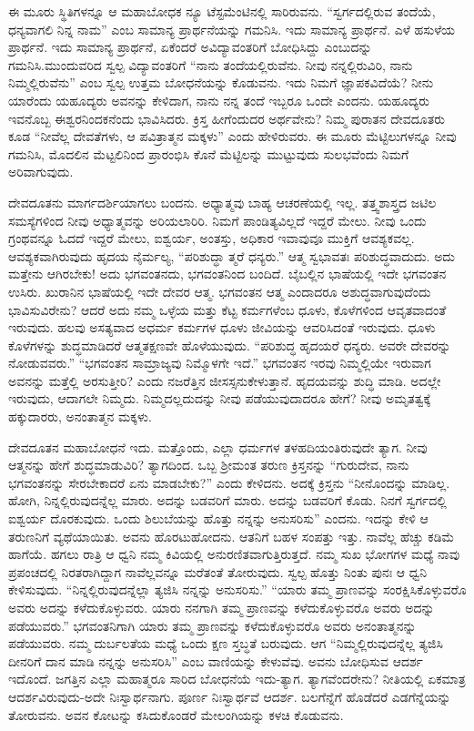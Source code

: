 ಈ ಮೂರು ಸ್ಥಿತಿಗಳನ್ನೂ ಆ ಮಹಾಬೋಧಕ ನ್ಯೂ ಟೆಸ್ಟಮೆಂಟಿನಲ್ಲಿ ಸಾರಿರುವನು. “ಸ್ವರ್ಗದಲ್ಲಿರುವ ತಂದೆಯೆ, ಧನ್ಯವಾಗಲಿ ನಿನ್ನ ನಾಮ” ಎಂಬ ಸಾಮಾನ್ಯ ಪ್ರಾರ್ಥನೆಯನ್ನು ಗಮನಿಸಿ. ಇದು ಸಾಮಾನ್ಯ ಪ್ರಾರ್ಥನೆ. ಎಳೆ ಹಸುಳೆಯ ಪ್ರಾರ್ಥನೆ. ಇದು ಸಾಮಾನ್ಯ ಪ್ರಾರ್ಥನೆ, ಏಕೆಂದರೆ ಅವಿದ್ಯಾವಂತರಿಗೆ ಬೋಧಿಸಿದ್ದು ಎಂಬುದನ್ನು ಗಮನಿಸಿ.\break ಮುಂದುವರಿದ ಸ್ವಲ್ಪ ವಿದ್ಯಾವಂತರಿಗೆ “ನಾನು ತಂದೆಯಲ್ಲಿರುವೆನು. ನೀವು ನನ್ನಲ್ಲಿರುವಿರಿ, ನಾನು ನಿಮ್ಮಲ್ಲಿರುವೆನು” ಎಂಬ ಸ್ವಲ್ಪ ಉತ್ತಮ ಬೋಧನೆಯನ್ನು ಕೊಡುವನು. ಇದು ನಿಮಗೆ ಜ್ಞಾಪಕವಿದೆಯೆ? ನೀನು ಯಾರೆಂದು ಯಹೂದ್ಯರು ಅವನನ್ನು ಕೇಳಿದಾಗ, ನಾನು ನನ್ನ ತಂದೆ ಇಬ್ಬರೂ ಒಂದೇ ಎಂದನು. ಯಹೂದ್ಯರು ಇವನೊಬ್ಬ ಈಶ್ವರನಿಂದಕನೆಂದು ಭಾವಿಸಿದರು. ಕ್ರಿಸ್ತ ಹೀಗೆಂದುದರ ಅರ್ಥವೇನು? ನಿಮ್ಮ ಪುರಾತನ ದೇವದೂತರು ಕೂಡ “ನೀವೆಲ್ಲ ದೇವತೆಗಳು, ಆ ಪವಿತ್ರಾತ್ಮನ ಮಕ್ಕಳು” ಎಂದು ಹೇಳಿರುವರು. ಈ ಮೂರು ಮೆಟ್ಟಿಲುಗಳನ್ನೂ ನೀವು ಗಮನಿಸಿ, ಮೊದಲಿನ ಮೆಟ್ಟಲಿನಿಂದ ಪ್ರಾರಂಭಿಸಿ ಕೊನೆ ಮೆಟ್ಟಿಲನ್ನು ಮುಟ್ಟುವುದು ಸುಲಭವೆಂದು ನಿಮಗೆ ಅರಿವಾಗುವುದು.

ದೇವದೂತನು ಮಾರ್ಗದರ್ಶಿಯಾಗಲು ಬಂದನು. ಅಧ್ಯಾತ್ಮವು ಬಾಹ್ಯ ಆಚರಣೆಯಲ್ಲಿ ಇಲ್ಲ. ತತ್ತ್ವಶಾಸ್ತ್ರದ ಜಟಿಲ ಸಮಸ್ಯೆಗಳಿಂದ ನೀವು ಅಧ್ಯಾತ್ಮವನ್ನು ಅರಿಯಲಾರಿರಿ. ನಿಮಗೆ ಪಾಂಡಿತ್ಯವಿಲ್ಲದೆ ಇದ್ದರೆ ಮೇಲು. ನೀವು ಒಂದು ಗ್ರಂಥವನ್ನೂ ಓದದೆ ಇದ್ದರೆ ಮೇಲು, ಐಶ್ವರ್ಯ, ಅಂತಸ್ತು, ಅಧಿಕಾರ ಇವಾವುವೂ ಮುಕ್ತಿಗೆ ಆವಶ್ಯಕವಲ್ಲ. ಆವಶ್ಯಕ\-ವಾಗಿರುವುದು ಹೃದಯ ನೈರ್ಮಲ್ಯ, “ಪರಿಶುದ್ಧಾ ತ್ಮರೆ ಧನ್ಯರು.” ಆತ್ಮ ಸ್ವಭಾವತಃ ಪರಿಶುದ್ಧ\-ವಾದುದು. ಅದು ಮತ್ತೇನು ಆಗಿರಬೇಕು! ಅದು ಭಗವಂತನದು, ಭಗವಂತನಿಂದ ಬಂದಿದೆ. ಬೈಬಲ್ಲಿನ ಭಾಷೆಯಲ್ಲಿ ಇದೇ ಭಗವಂತನ ಉಸಿರು. ಖುರಾನಿನ ಭಾಷೆಯಲ್ಲಿ ಇದೇ ದೇವರ ಆತ್ಮ. ಭಗವಂತನ ಆತ್ಮ ಎಂದಾದರೂ ಅಶುದ್ಧವಾಗುವುದೆಂದು ಭಾವಿಸುವಿ\-ರೇನು? ಆದರೆ ಅದು ನಮ್ಮ ಒಳ್ಳೆಯ ಮತ್ತು ಕೆಟ್ಟ ಕರ್ಮಗಳೆಂಬ ಧೂಳು, ಕೊಳೆಗಳಿಂದ ಆವೃತ\-ವಾದಂತೆ ಇರುವುದು. ಹಲವು ಅಸತ್ಯವಾದ ಅಧರ್ಮ ಕರ್ಮಗಳ ಧೂಳು ಜೀವಿಯನ್ನು ಆವರಿಸಿದಂತೆ ಇರುವುದು. ಧೂಳು ಕೊಳೆಗಳನ್ನು ಶುದ್ಧಮಾಡಿದರೆ ಆತ್ಮ\break ತಕ್ಷಣವೇ ಹೊಳೆಯುವುದು. “ಪರಿಶುದ್ಧ ಹೃದಯರೆ ಧನ್ಯರು. ಅವರೇ ದೇವರನ್ನು ನೋಡುವವರು.” “ಭಗವಂತನ ಸಾಮ್ರಾಜ್ಯವು ನಿಮ್ಮೊಳಗೇ ಇದೆ.” ಭಗವಂತನ ಇರವು ನಿಮ್ಮಲ್ಲಿಯೇ ಇರುವಾಗ ಅವನನ್ನು ಮತ್ತೆಲ್ಲಿ ಅರಸುತ್ತೀರಿ? ಎಂದು ನಜರೆತ್ತಿನ ಜೀಸಸ್ಸನು\break ಕೇಳುತ್ತಾನೆ. ಹೃದಯವನ್ನು ಶುದ್ಧಿ ಮಾಡಿ. ಅದಲ್ಲೇ ಇರುವುದು, ಆದಾಗಲೇ ನಿಮ್ಮದು. ನಿಮ್ಮದಲ್ಲದುದನ್ನು ನೀವು ಪಡೆಯುವುದಾದರೂ ಹೇಗೆ? ನೀವು ಅಮೃತತ್ವಕ್ಕೆ ಹಕ್ಕು\-ದಾರರು, ಅನಂತಾತ್ಮನ ಮಕ್ಕಳು.

ದೇವದೂತನ ಮಹಾಬೋಧನೆ ಇದು. ಮತ್ತೊಂದು, ಎಲ್ಲಾ ಧರ್ಮಗಳ ತಳಹದಿಯಂತಿರುವುದೇ ತ್ಯಾಗ. ನೀವು ಆತ್ಮನನ್ನು ಹೇಗೆ ಶುದ್ಧಮಾಡುವಿರಿ? ತ್ಯಾಗದಿಂದ. ಒಬ್ಬ ಶ‍್ರೀಮಂತ ತರುಣ ಕ್ರಿಸ್ತನನ್ನು “ಗುರುದೇವ, ನಾನು ಭಗವಂತನನ್ನು ಸೇರಬೇಕಾದರೆ ಏನು ಮಾಡಬೇಕು?” ಎಂದು ಕೇಳಿದನು. ಅದಕ್ಕೆ ಕ್ರಿಸ್ತನು “ನೀನೊಂದನ್ನು ಮಾಡಿಲ್ಲ. ಹೋಗಿ, ನಿನ್ನಲ್ಲಿರುವುದನ್ನೆಲ್ಲ ಮಾರು. ಅದನ್ನು ಬಡವರಿಗೆ ಮಾರು. ಅದನ್ನು ಬಡವರಿಗೆ ಕೊಡು. ನಿನಗೆ ಸ್ವರ್ಗದಲ್ಲಿ ಐಶ್ವರ್ಯ ದೊರಕುವುದು. ಒಂದು ಶಿಲುಬೆಯನ್ನು ಹೊತ್ತು ನನ್ನನ್ನು ಅನುಸರಿಸು” ಎಂದನು. ಇದನ್ನು ಕೇಳಿ ಆ ತರುಣನಿಗೆ ವ್ಯಥೆ\-ಯಾಯಿತು. ಅವನು ಹೊರಟುಹೋದನು. ಆತನಿಗೆ ಬಹಳ ಸಂಪತ್ತು ಇತ್ತು. ನಾವೆಲ್ಲ ಹೆಚ್ಚು ಕಡಿಮೆ ಹಾಗೆಯೆ. ಹಗಲು ರಾತ್ರಿ ಆ ಧ್ವನಿ ನಮ್ಮ ಕಿವಿಯಲ್ಲಿ ಅನುರಣಿತವಾಗುತ್ತಿರುತ್ತದೆ. ನಮ್ಮ ಸುಖ ಭೋಗಗಳ ಮಧ್ಯೆ ನಾವು ಪ್ರಪಂಚದಲ್ಲಿ ನಿರತರಾಗಿದ್ದಾಗ ನಾವೆಲ್ಲವನ್ನೂ ಮರೆತಂತೆ ತೋರುವುದು. ಸ್ವಲ್ಪ ಹೊತ್ತು ನಿಂತು ಪುನಃ ಆ ಧ್ವನಿ ಕೇಳಿಸುವುದು. “ನಿನ್ನಲ್ಲಿರುವುದನ್ನೆಲ್ಲಾ ತ್ಯಜಿಸಿ ನನ್ನನ್ನು ಅನುಸರಿಸು.” “ಯಾರು ತಮ್ಮ ಪ್ರಾಣವನ್ನು ಸಂರಕ್ಷಿಸಿಕೊಳ್ಳುವರೊ ಅವರು ಅದನ್ನು ಕಳೆದುಕೊಳ್ಳುವರು. ಯಾರು ನನಗಾಗಿ ತಮ್ಮ ಪ್ರಾಣವನ್ನು ಕಳೆದುಕೊಳ್ಳುವರೊ ಅವರು ಅದನ್ನು ಪಡೆಯುವರು.” ಭಗವಂತನಿಗಾಗಿ ಯಾರು ತಮ್ಮ ಪ್ರಾಣವನ್ನು ಕಳೆದು\-ಕೊಳ್ಳುವರೊ ಅವರು ಅನಂತಾತ್ಮನನ್ನು ಪಡೆಯುವರು. ನಮ್ಮ ದುರ್ಬಲತೆಯ ಮಧ್ಯೆ ಒಂದು ಕ್ಷಣ ಸ್ತಬ್ಧತೆ ಬರುವುದು. ಆಗ “ನಿಮ್ಮಲ್ಲಿರುವುದನ್ನೆಲ್ಲ ತ್ಯಜಿಸಿ ದೀನರಿಗೆ ದಾನ ಮಾಡಿ ನನ್ನನ್ನು ಅನುಸರಿಸಿ” ಎಂಬ ವಾಣಿಯನ್ನು ಕೇಳುವೆವು. ಅವನು ಬೋಧಿಸುವ ಆದರ್ಶ ಇದೊಂದೆ. ಜಗತ್ತಿನ ಎಲ್ಲಾ ಮಹಾತ್ಮರೂ ಸಾರಿದ ಬೋಧನೆಯೆ ಇದು-ತ್ಯಾಗ. ತ್ಯಾಗವೆಂದರೇನು? ನೀತಿಯಲ್ಲಿ ಏಕಮಾತ್ರ ಆದರ್ಶವಿರುವುದು-ಅದೇ ನಿಃಸ್ವಾರ್ಥನಾಗು. ಪೂರ್ಣ ನಿಃಸ್ವಾರ್ಥವೆ ಆದರ್ಶ. ಬಲಗೆನ್ನೆಗೆ ಹೊಡೆದರೆ ಎಡಗೆನ್ನೆಯನ್ನು ತೋರುವನು. ಅವನ ಕೋಟನ್ನು ಕಸಿದುಕೊಂಡರೆ ಮೇಲಂಗಿಯನ್ನು ಕಳಚಿ ಕೊಡುವನು.

